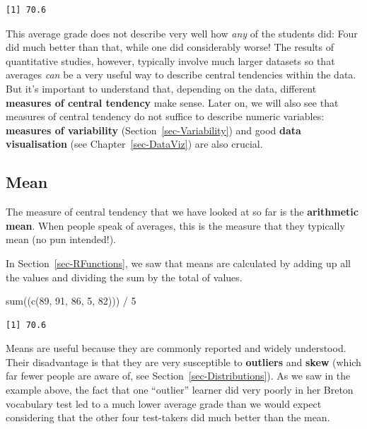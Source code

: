 \documentclass[
  letterpaper,
  DIV=11,
  numbers=noendperiod]{scrreprt}
\newenvironment{Shaded}{\begin{snugshade}}{\end{snugshade}}
\newcommand{\DecValTok}[1]{\textcolor[rgb]{0.68,0.00,0.00}{#1}}
\newcommand{\FunctionTok}[1]{\textcolor[rgb]{0.28,0.35,0.67}{#1}}
\newcommand{\NormalTok}[1]{\textcolor[rgb]{0.00,0.23,0.31}{#1}}
\newcommand{\SpecialCharTok}[1]{\textcolor[rgb]{0.37,0.37,0.37}{#1}}
\begin{document}
\begin{verbatim}
[1] 70.6
\end{verbatim}

This average grade does not describe very well how \emph{any} of the
students did: Four did much better than that, while one did considerably
worse! The results of quantitative studies, however, typically involve
much larger datasets so that averages \emph{can} be a very useful way to
describe central tendencies within the data. But it's important to
understand that, depending on the data, different \textbf{measures of
central tendency} make sense. Later on, we will also see that measures
of central tendency do not suffice to describe numeric variables:
\textbf{measures of variability} (Section~\ref{sec-Variability}) and
good \textbf{data visualisation} (see Chapter~\ref{sec-DataViz}) are
also crucial.

\subsection{Mean}\label{sec-Mean}

The measure of central tendency that we have looked at so far is the
\textbf{arithmetic mean}. When people speak of averages, this is the
measure that they typically mean (no pun intended!).

In Section~\ref{sec-RFunctions}, we saw that means are calculated by
adding up all the values and dividing the sum by the total of values.

\begin{Shaded}
\begin{Highlighting}[]
\FunctionTok{sum}\NormalTok{((}\FunctionTok{c}\NormalTok{(}\DecValTok{89}\NormalTok{, }\DecValTok{91}\NormalTok{, }\DecValTok{86}\NormalTok{, }\DecValTok{5}\NormalTok{, }\DecValTok{82}\NormalTok{))) }\SpecialCharTok{/} \DecValTok{5}
\end{Highlighting}
\end{Shaded}

\begin{verbatim}
[1] 70.6
\end{verbatim}

Means are useful because they are commonly reported and widely
understood. Their disadvantage is that they are very susceptible to
\textbf{outliers} and \textbf{skew} (which far fewer people are aware
of, see Section~\ref{sec-Distributions}). As we saw in the example
above, the fact that one ``outlier'' learner did very poorly in her
Breton vocabulary test led to a much lower average grade than we would
expect considering that the other four test-takers did much better than
the mean.
\end{document}
